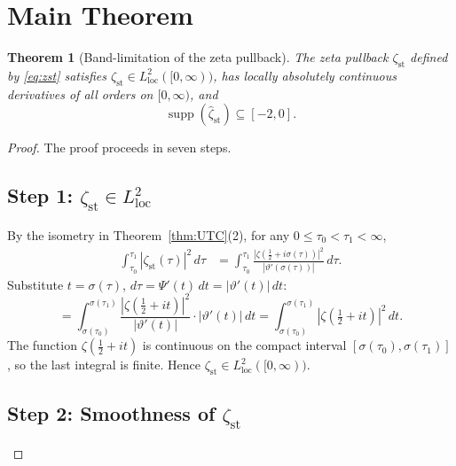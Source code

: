 \documentclass[11pt]{article}
\newtheorem{theorem}{Theorem}
\theoremstyle{definition}
\begin{document}
\section{Main Theorem}

\begin{theorem}[Band-limitation of the zeta pullback]
\label{thm:bandlimit}
The zeta pullback $\zeta_{\mathrm{st}}$ defined by
\eqref{eq:zst} satisfies
$\zeta_{\mathrm{st}}\in L^2_{\mathrm{loc}}([0,\infty))$, has locally
absolutely continuous derivatives of all orders on $[0,\infty)$, and
\[
\operatorname{supp}(\hat\zeta_{\mathrm{st}})\subseteq[-2,0].
\]
\end{theorem}

\begin{proof}
The proof proceeds in seven steps.

\subsection*{Step 1: \texorpdfstring{$\zeta_{\mathrm{st}}\in L^2_{\mathrm{loc}}$}{zeta\_st in L2loc}}

By the isometry in Theorem~\ref{thm:UTC}(2),
for any $0\le\tau_0<\tau_1<\infty$,
\begin{align*}
\int_{\tau_0}^{\tau_1}|\zeta_{\mathrm{st}}(\tau)|^2\,d\tau
&=\int_{\tau_0}^{\tau_1}
  \frac{|\zeta(\tfrac12+i\sigma(\tau))|^2}{|\vartheta'(\sigma(\tau))|}
  \,d\tau.
\end{align*}
Substitute $t=\sigma(\tau)$, $d\tau=\Psi'(t)\,dt=|\vartheta'(t)|\,dt$:
\[
=\int_{\sigma(\tau_0)}^{\sigma(\tau_1)}
  \frac{|\zeta(\tfrac12+it)|^2}{|\vartheta'(t)|}
  \cdot|\vartheta'(t)|\,dt
=\int_{\sigma(\tau_0)}^{\sigma(\tau_1)}|\zeta(\tfrac12+it)|^2\,dt.
\]
The function $\zeta(\tfrac12+it)$ is continuous on the compact interval
$[\sigma(\tau_0),\sigma(\tau_1)]$, so the last integral is finite.
Hence $\zeta_{\mathrm{st}}\in L^2_{\mathrm{loc}}([0,\infty))$.

\subsection*{Step 2: Smoothness of \texorpdfstring{$\zeta_{\mathrm{st}}$}{zeta\_st}}


\end{proof}
\end{document}
